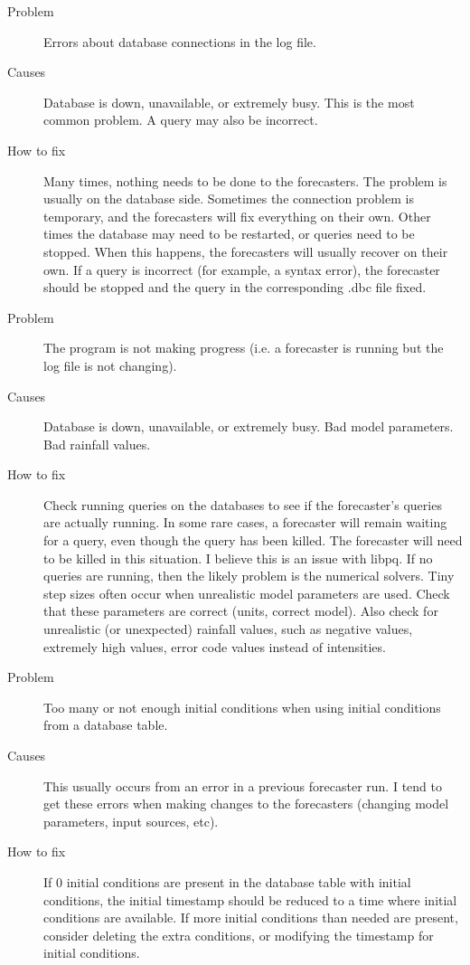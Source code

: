 \documentclass[12pt]{article}
\begin{document}
\begin{description}
 \item[Problem] Errors about database connections in the log file.
 \item[Causes] Database is down, unavailable, or extremely busy. This is the most common problem. A query may also be incorrect.
 \item[How to fix] Many times, nothing needs to be done to the forecasters. The problem is usually on the database side. Sometimes the connection problem is temporary, and the forecasters will fix everything on their own. Other times the database may need to be restarted, or queries 
need to be stopped. When this happens, the forecasters will usually recover on their own. If a query is incorrect (for example, a syntax error), the forecaster should be stopped and the query in the corresponding .dbc file fixed.
\end{description}

\vspace{.1in}
\begin{description}
 \item[Problem] The program is not making progress (i.e. a forecaster is running but the log file is not changing).
 \item[Causes] Database is down, unavailable, or extremely busy. Bad model parameters. Bad rainfall values.
 \item[How to fix] Check running queries on the databases to see if the forecaster's queries are actually running. In some rare cases, a forecaster will remain waiting for a query, even though the query has been killed. The forecaster will need to be killed in this situation. I believe this is an issue with libpq. If no queries are running, then the likely problem is the numerical solvers. Tiny step sizes often occur when unrealistic model parameters are used. Check that these parameters are correct (units, correct model). Also check for unrealistic (or unexpected) rainfall values, such as negative values, extremely high values, error code values instead of intensities.
\end{description}

\vspace{.1in}
\begin{description}
 \item[Problem] Too many or not enough initial conditions when using initial conditions from a database table.
 \item[Causes] This usually occurs from an error in a previous forecaster run. I tend to get these errors when making changes to the forecasters (changing model parameters, input sources, etc).
 \item[How to fix] If 0 initial conditions are present in the database table with initial conditions, the initial timestamp should be reduced to a time where initial conditions are available. If more initial conditions than needed are present, consider deleting the extra conditions, or modifying the timestamp for initial conditions.
\end{description}
\end{document}
